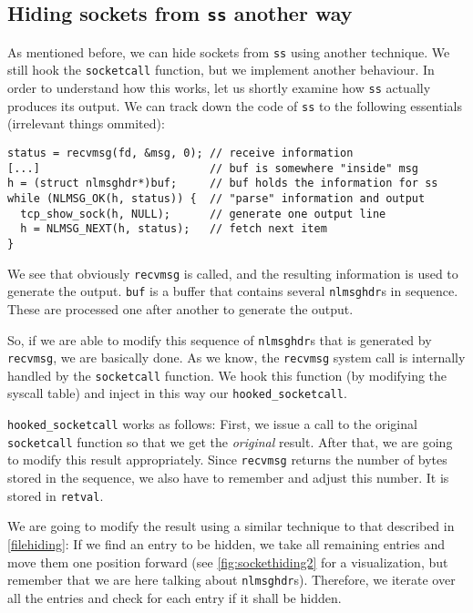 \documentclass[10pt, letterpaper]{article}
\begin{document}
\subsection{Hiding sockets from \texttt{ss} another way}
\label{sec:socket-hiding-evasion}

As mentioned before, we can hide sockets from \texttt{ss} using another technique. We still hook the \texttt{socketcall} function, but we implement another behaviour. In order to understand how this works, let us shortly examine how \texttt{ss} actually produces its output. We can track down the code of \texttt{ss} to the following essentials (irrelevant things ommited):

\begin{verbatim}
status = recvmsg(fd, &msg, 0); // receive information
[...]                          // buf is somewhere "inside" msg
h = (struct nlmsghdr*)buf;     // buf holds the information for ss
while (NLMSG_OK(h, status)) {  // "parse" information and output
  tcp_show_sock(h, NULL);      // generate one output line
  h = NLMSG_NEXT(h, status);   // fetch next item
}
\end{verbatim}

We see that obviously \texttt{recvmsg} is called, and the resulting information is used to generate the output. \texttt{buf} is a buffer that contains several \texttt{nlmsghdr}s in sequence. These are processed one after another to generate the output.

So, if we are able to modify this sequence of \texttt{nlmsghdr}s that is generated by \texttt{recvmsg}, we are basically done. As we know, the \texttt{recvmsg} system call is internally handled by the \texttt{socketcall} function. We hook this function (by modifying the syscall table) and inject in this way our \texttt{hooked\_socketcall}. 

\texttt{hooked\_socketcall} works as follows: First, we issue a call to the original \texttt{socketcall} function so that we get the \emph{original} result. After that, we are going to modify this result appropriately. Since \texttt{recvmsg} returns the number of bytes stored in the sequence, we also have to remember and adjust this number. It is stored in \texttt{retval}.

We are going to modify the result using a similar technique to that described in \autoref{filehiding}: If we find an entry to be hidden, we take all remaining entries and move them one position forward (see \autoref{fig:sockethiding2} for a visualization, but remember that we are here talking about \texttt{nlmsghdr}s). Therefore, we iterate over all the entries and check for each entry if it shall be hidden.
\end{document}

